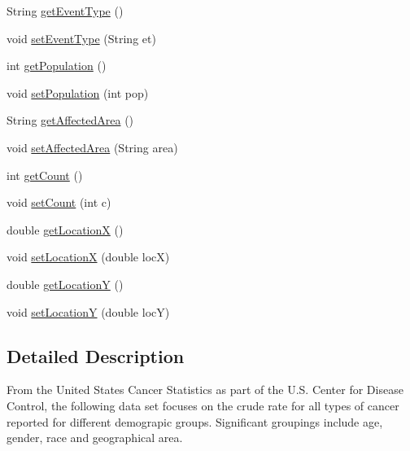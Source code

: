 \begin{DoxyCompactItemize}
String \mbox{\hyperlink{classbridges_1_1data__src__dependent_1_1_cancer_incidence_a844c6c3317bdb6b124f32b40804e1ff7}{get\+Event\+Type}} ()
\item 
void \mbox{\hyperlink{classbridges_1_1data__src__dependent_1_1_cancer_incidence_a39338b20223e60b79fa38b3034ca46b7}{set\+Event\+Type}} (String et)
\item 
int \mbox{\hyperlink{classbridges_1_1data__src__dependent_1_1_cancer_incidence_a41c2507d46589080f6bb76ab29f53665}{get\+Population}} ()
\item 
void \mbox{\hyperlink{classbridges_1_1data__src__dependent_1_1_cancer_incidence_a9f1caf002b6573aa699a81ed1b835af0}{set\+Population}} (int pop)
\item 
String \mbox{\hyperlink{classbridges_1_1data__src__dependent_1_1_cancer_incidence_ad4c0c709fa5da9c0f20b648052db5f26}{get\+Affected\+Area}} ()
\item 
void \mbox{\hyperlink{classbridges_1_1data__src__dependent_1_1_cancer_incidence_a9c7f2d303da9498e5e6145439c5a6fbc}{set\+Affected\+Area}} (String area)
\item 
int \mbox{\hyperlink{classbridges_1_1data__src__dependent_1_1_cancer_incidence_a8769cb18ddb590dc41a04a220174f3df}{get\+Count}} ()
\item 
void \mbox{\hyperlink{classbridges_1_1data__src__dependent_1_1_cancer_incidence_a18099439ef6e35cf240b06f0e0158c72}{set\+Count}} (int c)
\item 
double \mbox{\hyperlink{classbridges_1_1data__src__dependent_1_1_cancer_incidence_a24aa8144dcacd93a26c3c033471666df}{get\+LocationX}} ()
\item 
void \mbox{\hyperlink{classbridges_1_1data__src__dependent_1_1_cancer_incidence_a384149c413173fba51adad1b1769797a}{set\+LocationX}} (double locX)
\item 
double \mbox{\hyperlink{classbridges_1_1data__src__dependent_1_1_cancer_incidence_a53b56a9931a1d02ee356c6258e245aa8}{get\+LocationY}} ()
\item 
void \mbox{\hyperlink{classbridges_1_1data__src__dependent_1_1_cancer_incidence_a14c6921a71834c14d561bc7f2aa8a18e}{set\+LocationY}} (double locY)
\end{DoxyCompactItemize}


\subsection{Detailed Description}
From the United States Cancer Statistics as part of the U.\+S. Center for Disease Control, the following data set focuses on the crude rate for all types of cancer reported for different demograpic groups. Significant groupings include age, gender, race and geographical area.

